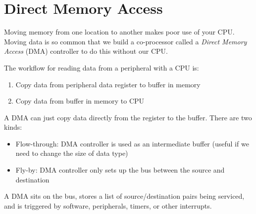 \section{Direct Memory Access}

Moving memory from one location to another makes poor use of your CPU.
Moving data is so common that we build a co-processor called a
\emph{Direct Memory Access} (DMA)
controller to do this without our CPU.

The workflow for reading data from a peripheral with a CPU is:
\begin{enumerate}
    \item Copy data from peripheral data register to buffer in memory
    \item Copy data from buffer in memory to CPU
\end{enumerate}

A DMA can just copy data directly from the register to the buffer. There
are two kinds:
\begin{itemize}
    \item Flow-through: DMA controller is used as an
          intermediate buffer (useful if we
          need to change the size of data type)
    \item Fly-by: DMA controller only sets up the bus
          between the source and destination
\end{itemize}

A DMA sits on the bus, stores a list of source/destination
pairs being serviced, and is triggered by software, peripherals,
timers, or other interrupts.